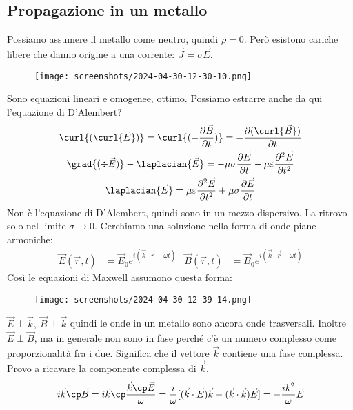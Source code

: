 \subsection{Propagazione in un metallo}
Possiamo assumere il metallo come neutro, quindi \(\rho =0\). Però esistono cariche libere che danno origine a una corrente: \(\vec{J}= \sigma \vec{E}\).
\begin{figure}[H]
	\centering
	\texttt{[image: screenshots/2024-04-30-12-30-10.png]}
\end{figure}
Sono equazioni lineari e omogenee, ottimo. Possiamo estrarre anche da qui l'equazione di D'Alembert?
\begin{gather}
	\curl{(\curl{\vec{E}} )} = \curl{(-\frac{\partial \vec{B}}{\partial t} )} = - \frac{\partial (\curl{\vec{B}} )}{\partial t}\\
	\grad{(\div{\vec{E}} )} - \laplacian{\vec{E}} = - \mu \sigma \frac{\partial \vec{E}}{\partial t} - \mu \varepsilon \frac{\partial ^{2} \vec{E}}{\partial t^{2} }\\
	\laplacian{\vec{E}}=\mu \varepsilon \frac{\partial ^{2} \vec{E}}{\partial t^{2} }+\mu \sigma \frac{\partial \vec{E}}{\partial t}    
\end{gather}
Non è l'equazione di D'Alembert, quindi sono in un mezzo dispersivo. La ritrovo solo nel limite \(\sigma \to 0\). Cerchiamo una soluzione nella forma di onde piane armoniche:
\begin{align}
	\vec{E}(\vec{r},t) &= \vec{E}_0 e^{i(\vec{k}\cdot \vec{r} - \omega t)} & \vec{B}(\vec{r},t)&= \vec{B}_0 e^{i (\vec{k}\cdot \vec{r}-\omega t)}
\end{align}
Così le equazioni di Maxwell assumono questa forma:
\begin{figure}[H]
	\centering
	\texttt{[image: screenshots/2024-04-30-12-39-14.png]}
\end{figure}
\(\vec{E} \perp \vec{k},\ \vec{B}\perp \vec{k}\) quindi le onde in un metallo sono ancora onde trasversali. Inoltre \(\vec{E}\perp \vec{B}\), ma in generale non sono in fase perché c'è un numero complesso come proporzionalità fra i due. Significa che il vettore \(\vec{k}\) contiene una fase complessa. Provo a ricavare la componente complessa di \(\vec{k}\).
\begin{equation}
	i \vec{k} \cp \vec{B} = i \vec{k} \cp \frac{\vec{k}\cp \vec{E}}{\omega } = \frac{i}{\omega } [(\vec{k} \cdot \vec{E})\vec{k} - (\vec{k}\cdot \vec{k})\vec{E}] = -\frac{ik^{2} }{\omega }\vec{E}
\end{equation}
